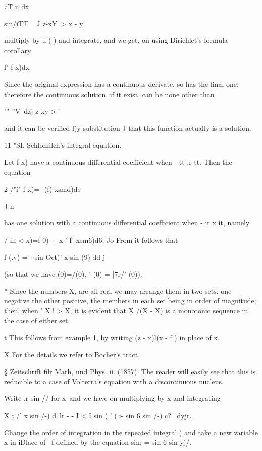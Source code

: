 {7T n dx

sin/iTT ~ J z-xY~> x - y

multiply by u ( ) and integrate, and we get, on using Dirichlet's
formula  corollary\

  f' f x)dx

Since the original expression has a continuous derivate, so has the
final one; therefore the continuous solution, if it exist, can be
none other than

"" ''V~dzj z-xy-> '

and it can be verified l)y substitution J that this function actually
is a solution.

11 "SI. Schlomilch's integral equation.

Let f x) have a continuous differential coefficient when - tt .r tt.
Then the equation

2 /"i" f x)=- (f) xsmd)de

  J n

has one solution with a continuoiis differential coefficient when - it
x it, namely

/ in < x)=f 0) + x ' f' xsm6)d6. Jo From it follows that

f (.v) = - sin Oct)' x sin (9) dd j

(so that we have (0)=/(0), ' (0) = |7r/' (0)).

* Since the numbers X, are all real we may arrange them in two sets,
one negative the other positive, the members in each set being in
order of magnitude; then, when ' X ! > X, it is evident that X /(X -
X) is a monotonic sequence in the case of either set.

t This follows from example 1, by writing (z - x)l(x - f ) in
place of x.

X For the details we refer to Bocher's tract.

§ Zeitschrift filr Math, und Phys. ii. (1857). The reader will easily
see that this is reducible to a case of Volterra's equation with a
discontinuous nucleus.

%
%

Write .r sin // for x\ and we have on multiplying by x and integrating

X j /' x sin \//-) d\ lr - - I < I sin ( ' (.i- sin 6 sin \//-) c? \
dyjr.

Change the order of integration in the repeated integral ) and
take a new variable x in iDlace of \ f defined by the equation sin; =
sin 6 sin yj/.

}
